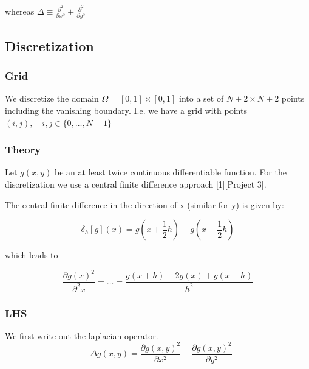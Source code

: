 \documentclass[unicode,11pt,a4paper,oneside,numbers=endperiod,openany]{scrartcl}
\begin{document}
whereas $\Delta \equiv \frac{\partial^2}{\partial x^2} + \frac{\partial^2}{\partial y^2}$

\subsection{Discretization}

\subsubsection{Grid}
We discretize the domain $\Omega = [0,1]\times[0,1]$ into a set of $N+2 \times N+2$
points including the vanishing boundary.
I.e. we have a grid with points $(i,j), \quad i,j\in\{0,\dots, N+1\}$



\subsubsection{Theory}
Let $g(x,y)$ be an at least twice continuous differentiable function. For the
discretization we use a central finite difference approach [1][Project 3].

The central finite difference in the direction of x (similar for y) is given by:

\begin{equation}
  \delta_h [g](x) = g(x+\frac{1}{2}h) - g(x-\frac{1}{2}h)
\end{equation}

which leads to

\begin{equation}
  \frac{\partial g(x)^2}{\partial^2 x} = \dots = 
    \frac{g(x + h) - 2g(x) + g(x - h)}{h^2}
\end{equation}

\subsubsection{LHS}
We first write out the laplacian operator.
\begin{equation}
  -\Delta g(x, y) = \frac{\partial g(x, y)^2}{\partial x^2} 
                      + \frac{\partial g(x, y)^2}{\partial y^2}
\end{equation}
\end{document}
